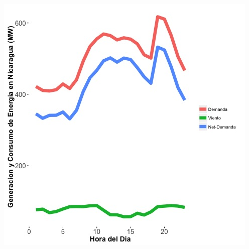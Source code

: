 \documentclass{article}\usepackage[]{graphicx}\usepackage[]{color}
\newenvironment{knitrout}{}{} %
\begin{document}



%



%

 

\begin{knitrout}
\color{fgcolor}
\includegraphics[scale=0.65]{figure/gridplot1.jpg} 
\end{knitrout}
\end{document}
